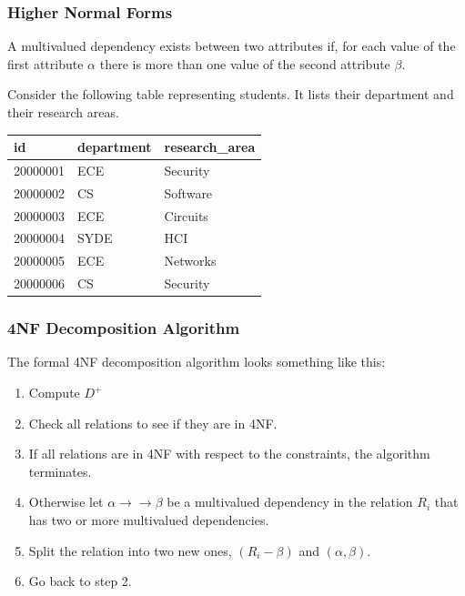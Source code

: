 \begin{frame}
\frametitle{Higher Normal Forms}

A multivalued dependency exists between two attributes if, for each value of the first attribute $\alpha$ there is more than one value of the second attribute $\beta$.

Consider the following table representing students. It lists their department and their research areas. 

\begin{center}
\begin{tabular}{|l|l|l|} \hline
	\textbf{id} & \textbf{department} & \textbf{research\_area} \\ \hline
	20000001 & ECE & Security \\ \hline
	20000002 & CS & Software \\ \hline
    20000003 & ECE & Circuits \\ \hline
    20000004 & SYDE & HCI \\ \hline
    20000005 & ECE & Networks \\ \hline
    20000006 & CS & Security \\ \hline
\end{tabular}
\end{center}

\end{frame}



\begin{frame}
\frametitle{4NF Decomposition Algorithm}

The formal 4NF decomposition algorithm looks something like this:

\begin{enumerate}
	\item Compute $D^{+}$
	\item Check all relations to see if they are in 4NF.
	\item If all relations are in 4NF with respect to the constraints, the algorithm terminates.
	\item Otherwise let $\alpha \rightarrow\rightarrow \beta$ be a multivalued dependency in the relation $R_{i}$ that has two or more multivalued dependencies. 
	\item Split the relation into two new ones, $(R_{i} - \beta)$ and $(\alpha, \beta)$.
	\item Go back to step 2.
\end{enumerate}

\end{frame}



